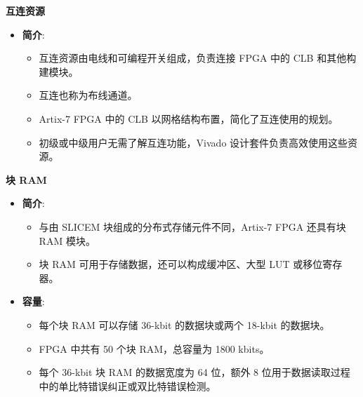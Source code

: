 \documentclass[
  ignorenonframetext,
  chinese,
]{beamer}
\providecommand{\tightlist}{%
  \setlength{\itemsep}{0pt}\setlength{\parskip}{0pt}}
\begin{document}
\begin{frame}
\begin{block}{\textbf{互连资源}}
\label{ux4e92ux8fdeux8d44ux6e90}
\begin{itemize}
\tightlist
\item
  \textbf{简介}:

  \begin{itemize}
  \tightlist
  \item
    互连资源由电线和可编程开关组成，负责连接 FPGA 中的 CLB
    和其他构建模块。
  \item
    互连也称为布线通道。
  \item
    Artix-7 FPGA 中的 CLB 以网格结构布置，简化了互连使用的规划。
  \item
    初级或中级用户无需了解互连功能，Vivado
    设计套件负责高效使用这些资源。
  \end{itemize}
\end{itemize}
\end{block}
\end{frame}

\begin{frame}
\begin{block}{\textbf{块 RAM}}
\label{ux5757-ram}
\begin{itemize}
\tightlist
\item
  \textbf{简介}:

  \begin{itemize}
  \tightlist
  \item
    与由 SLICEM 块组成的分布式存储元件不同，Artix-7 FPGA 还具有块 RAM
    模块。
  \item
    块 RAM 可用于存储数据，还可以构成缓冲区、大型 LUT 或移位寄存器。
  \end{itemize}
\item
  \textbf{容量}:

  \begin{itemize}
  \tightlist
  \item
    每个块 RAM 可以存储 36-kbit 的数据块或两个 18-kbit 的数据块。
  \item
    FPGA 中共有 50 个块 RAM，总容量为 1800 kbits。
  \item
    每个 36-kbit 块 RAM 的数据宽度为 64 位，额外 8
    位用于数据读取过程中的单比特错误纠正或双比特错误检测。
  \end{itemize}
\end{itemize}
\end{block}
\end{frame}
\end{document}
